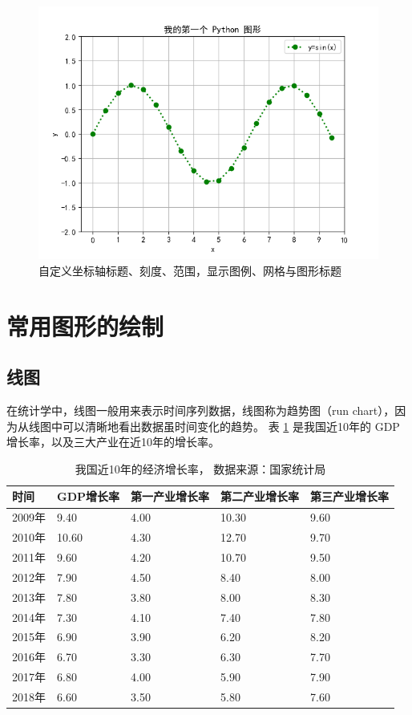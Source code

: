 \begin{figure}[!ht]
  \centering
  \includegraphics[width=\textwidth]{figure/sinx2.png}
  \caption{自定义坐标轴标题、刻度、范围，显示图例、网格与图形标题}\label{fig:sinx2}
\end{figure}


\section{常用图形的绘制}
\subsection{线图}

在统计学中，线图一般用来表示时间序列数据，线图称为趋势图（run chart），因为从线图中可以清晰地看出数据虽时间变化的趋势。 表 \ref{table:GDP} 是我国近10年的 GDP 增长率，以及三大产业在近10年的增长率。


\begin{table}[!ht]
\centering
\renewcommand{\arraystretch}{1.2}
\caption{我国近10年的经济增长率， 数据来源：国家统计局}\label{table:GDP}
\begin{tabular}{|l|l|l|l|l|}
\hline

时间 & GDP增长率 & 第一产业增长率 & 第二产业增长率 & 第三产业增长率 \\ \hline
2009年 & 9.40  & 4.00  & 10.30  & 9.60  \\ \hline
2010年 & 10.60  & 4.30  & 12.70  & 9.70  \\ \hline
2011年 & 9.60  & 4.20  & 10.70  & 9.50  \\ \hline
2012年 & 7.90  & 4.50  & 8.40  & 8.00  \\ \hline
2013年 & 7.80  & 3.80  & 8.00  & 8.30  \\ \hline
2014年 & 7.30  & 4.10  & 7.40  & 7.80  \\ \hline
2015年 & 6.90  & 3.90  & 6.20  & 8.20  \\ \hline
2016年 & 6.70  & 3.30  & 6.30  & 7.70  \\ \hline
2017年 & 6.80  & 4.00  & 5.90  & 7.90  \\ \hline
2018年 & 6.60  & 3.50  & 5.80  & 7.60 \\ \hline
\end{tabular}
\end{table}



